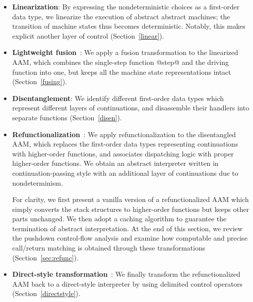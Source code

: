 \documentclass[acmsmall, screen]{acmart}\settopmatter{}
\begin{document}
\begin{itemize}
  \item \textbf{Linearization}: By expressing the
    nondeterministic choices as a first-order data type, we linearize the execution
    of abstract abstract machines; the transition of machine states thus becomes
    deterministic. Notably, this makes explicit another layer of control (Section~\ref{linear}).

  \item \textbf{Lightweight fusion}~\cite{DANVY2008100,Ohori:2007:LFF:1190216.1190241}:
    We apply a fusion transformation to the linearized AAM, which
    combines the single-step function @step@ and the
    driving function into one, but keeps all the machine state representations intact
    (Section~\ref{fusing}).

  \item \textbf{Disentanglement}: We identify
    different first-order data types which represent different layers of continuations, and
    disassemble their handlers into separate functions
    (Section~\ref{disen}).

  \item \textbf{Refunctionalization}~\cite{DANVY2009534,Danvy:2006:RW:2171265.2171268}:
    We apply refunctionalization to the disentangled AAM, which
    replaces the first-order data types representing continuations with
    higher-order functions, and associates dispatching logic with proper higher-order functions.
    We obtain an abstract interpreter written in continuation-passing style with an
    additional layer of continuations due to nondeterminism.

    For clarity, we first present a vanilla version of a refunctionalized AAM which simply
    converts the stack structures to higher-order functions but keeps other parts unchanged.
    We then adopt a caching algorithm \cite{darais2017abstracting} to guarantee the termination
    of abstract interpretation.
    At the end of this section, we review the pushdown control-flow analysis and examine how
    computable and precise call/return matching is obtained through these transformations
    (Section~\ref{sec:refunc}).

  \item \textbf{Direct-style transformation}~\cite{DBLP:journals/scp/Danvy94}:
    We finally transform the refunctionalized AAM back to a
    direct-style interpreter by using delimited control operators
    (Section~\ref{directstyle}).
\end{itemize}
\end{document}
